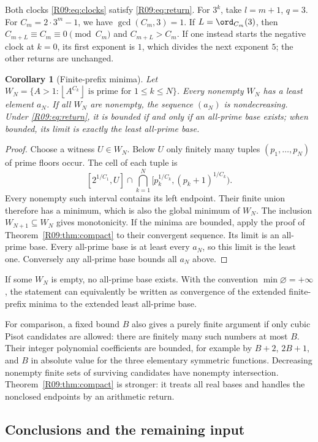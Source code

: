 \documentclass[11pt,a4paper]{article}
\newtheorem{corollary}[theorem]{Corollary}\newtheorem{mainthm}[theorem]{Theorem}
\theoremstyle{definition}\newtheorem{definition}[theorem]{Definition}
\theoremstyle{remark}\newtheorem{remark}[theorem]{Remark}
\newcommand{\floor}[1]{\left\lfloor#1\right\rfloor}
\begin{document}
Both clocks \eqref{R09:eq:clocks} satisfy \eqref{R09:eq:return}. For $3^k$,
take $l=m+1$, $q=3$. For $C_m=2\cdot3^m-1$, we have
$\gcd(C_m,3)=1$. If $L=\ord_{C_m}(3)$, then
$C_{m+L}\equiv C_m\equiv0\pmod{C_m}$ and $C_{m+L}>C_m$.
If one instead starts the negative clock at $k=0$, its first exponent
is $1$, which divides the next exponent $5$; the other returns are
unchanged.

\begin{corollary}[Finite-prefix minima]\label{R09:cor:minima}
Let $W_N=\{A>1:\floor{A^{C_k}}\text{ is prime for }1\le k\le N\}$.
Every nonempty $W_N$ has a least element $a_N$. If all $W_N$ are
nonempty, the sequence $(a_N)$ is nondecreasing. Under
\eqref{R09:eq:return}, it is bounded if and only if an all-prime base
exists; when bounded, its limit is exactly the least all-prime base.
\end{corollary}
\begin{proof}
Choose a witness $U\in W_N$. Below $U$ only finitely many tuples
$(p_1,\ldots,p_N)$ of prime floors occur. The cell of each tuple is
\[
 [2^{1/C_1},U]\cap
 \bigcap_{k=1}^N[p_k^{1/C_k},(p_k+1)^{1/C_k}).
\]
Every nonempty such interval contains its left endpoint. Their finite
union therefore has a minimum, which is also the global minimum of
$W_N$. The inclusion $W_{N+1}\subseteq W_N$ gives monotonicity.
If the minima are bounded, apply the proof of
Theorem~\ref{R09:thm:compact} to their convergent sequence. Its limit is
an all-prime base. Every all-prime base is at least every $a_N$, so
this limit is the least one. Conversely any all-prime base bounds
all $a_N$ above.
\end{proof}

If some $W_N$ is empty, no all-prime base exists. With the convention
$\min\varnothing=+\infty$, the statement can equivalently be written
as convergence of the extended finite-prefix minima to the extended
least all-prime base.

For comparison, a fixed bound $B$ also gives a purely finite argument
if only cubic Pisot candidates are allowed: there are finitely many
such numbers at most $B$. Their integer polynomial coefficients are
bounded, for example by $B+2$, $2B+1$, and $B$ in absolute value for
the three elementary symmetric functions. Decreasing nonempty
finite sets of surviving candidates have nonempty intersection.
Theorem~\ref{R09:thm:compact} is stronger: it treats all real bases and
handles the nonclosed endpoints by an arithmetic return.

\subsection{Conclusions and the remaining input}
\end{document}
